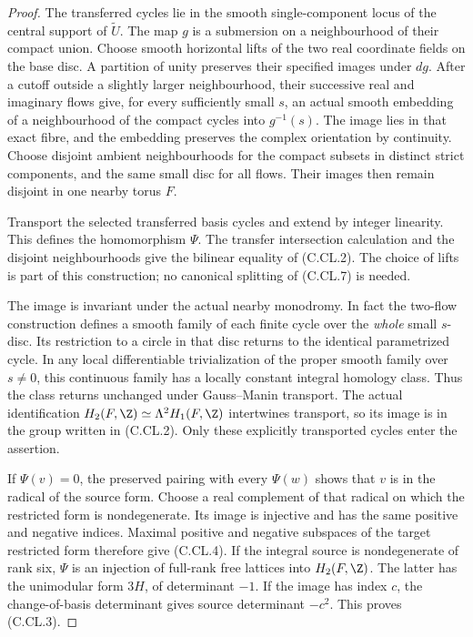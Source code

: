 \begin{proof}
The transferred cycles lie in the smooth
single-component locus of the central
support of $\widetilde U$. The map $g$ is
a submersion on a neighbourhood of their
compact union. Choose smooth horizontal
lifts of the two real coordinate fields
on the base disc. A partition of unity
preserves their specified images under
$dg$. After a cutoff outside a slightly
larger neighbourhood, their successive
real and imaginary flows give, for every
sufficiently small $s$, an actual smooth
embedding of a neighbourhood of the compact
cycles into $g^{-1}(s)$. The image lies in
that exact fibre, and the embedding preserves
the complex orientation by continuity.
Choose disjoint ambient neighbourhoods for
the compact subsets in distinct strict
components, and the same small disc for
all flows. Their images then remain
disjoint in one nearby torus $F$.

Transport the selected transferred basis
cycles and extend by integer linearity.
This defines the homomorphism $\Psi$.
The transfer intersection calculation and
the disjoint neighbourhoods give the
bilinear equality of (C.CL.2). The choice
of lifts is part of this construction;
no canonical splitting of (C.CL.7) is
needed.

The image is invariant under the actual
nearby monodromy. In fact the two-flow
construction defines a smooth family of
each finite cycle over the \emph{whole}
small $s$-disc. Its restriction to a
circle in that disc returns to the
identical parametrized cycle. In any
local differentiable trivialization of
the proper smooth family over $s\ne0$,
this continuous family has a locally
constant integral homology class.
Thus the class returns unchanged under
Gauss--Manin transport. The actual
identification
$H_2(F,\Z)\simeq\Lambda^2H_1(F,\Z)$
intertwines transport, so its image is
in the group written in (C.CL.2).
Only these explicitly transported
cycles enter the assertion.

If $\Psi(v)=0$, the preserved pairing
with every $\Psi(w)$ shows that $v$
is in the radical of the source form.
Choose a real complement of that radical
on which the restricted form is
nondegenerate. Its image is injective
and has the same positive and negative
indices. Maximal positive and negative
subspaces of the target restricted form
therefore give (C.CL.4). If the integral
source is nondegenerate of rank six,
$\Psi$ is an injection of full-rank
free lattices into $H_2(F,\Z)$.
The latter has the unimodular form
$3H$, of determinant $-1$. If the
image has index $c$, the change-of-basis
determinant gives source determinant
$-c^2$. This proves (C.CL.3).


\end{proof}
